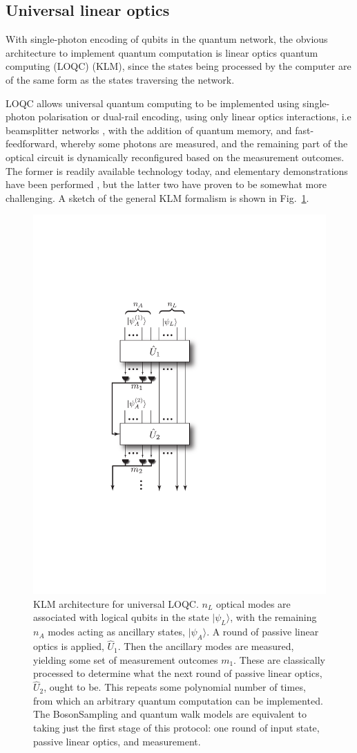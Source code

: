 \documentclass[aps,rmp,twocolumn,amsmath,amssymb,nofootinbib,superscriptaddress]{revtex4}
\newcommand{\ket}[1]{|#1\rangle}
\begin{document}
%
%

\subsection{Universal linear optics} \label{sec:KLM_univ}

With single-photon encoding of qubits in the quantum network, the obvious architecture to implement quantum computation is linear optics quantum computing (LOQC) \cite{bib:KLM01, bib:Kok05, bib:KokLovettBook} (KLM), since the states being processed by the computer are of the same form as the states traversing the network.

LOQC allows universal quantum computing to be implemented using single-photon polarisation or dual-rail encoding, using only linear optics interactions, i.e beamsplitter networks \cite{bib:Reck94}, with the addition of quantum memory, and fast-feedforward, whereby some photons are measured, and the remaining part of the optical circuit is dynamically reconfigured based on the measurement outcomes. The former is readily available technology today, and elementary demonstrations have been performed \cite{bib:OBrien03, bib:UniversalLOOBrien}, but the latter two have proven to be somewhat more challenging. A sketch of the general KLM formalism is shown in Fig.~\ref{fig:KLM_protocol}.

\begin{figure}[!htb]
\includegraphics[width=0.5\columnwidth]{KLM}
\caption{KLM architecture for universal LOQC. $n_L$ optical modes are associated with logical qubits in the state $\ket{\psi_L}$, with the remaining $n_A$ modes acting as ancillary states, $\ket{\psi_A}$. A round of passive linear optics is applied, $\hat{U}_1$. Then the ancillary modes are measured, yielding some set of measurement outcomes $m_1$. These are classically processed to determine what the next round of passive linear optics, $\hat{U}_2$, ought to be. This repeats some polynomial number of times, from which an arbitrary quantum computation can be implemented. The {\sc BosonSampling} and quantum walk models are equivalent to taking just the first stage of this protocol: one round of input state, passive linear optics, and measurement.} \label{fig:KLM_protocol}
\end{figure}
\end{document}
